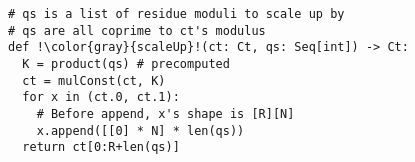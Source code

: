 \begin{figure}
\begin{lstlisting}[escapechar=!,label=lst:scaleUp,caption={
Implementation of \texttt{scaleUp}.
}]
# qs is a list of residue moduli to scale up by
# qs are all coprime to ct's modulus
def !\color{gray}{scaleUp}!(ct: Ct, qs: Seq[int]) -> Ct:
  K = product(qs) # precomputed
  ct = mulConst(ct, K)
  for x in (ct.0, ct.1):
    # Before append, x's shape is [R][N]
    x.append([[0] * N] * len(qs))
  return ct[0:R+len(qs)]
\end{lstlisting}
\end{figure}
